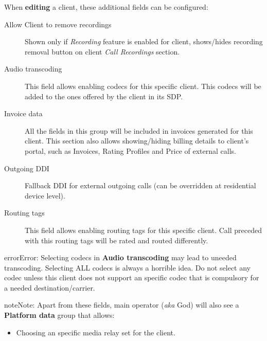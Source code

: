 \documentclass[letterpaper,10pt,english]{sphinxmanual}
\begin{document}
When \textbf{editing} a client, these additional fields can be configured:
\begin{description}
\item[{Allow Client to remove recordings}] \leavevmode{}\label{administration_portal/brand/clients/retail:term-allow-client-to-remove-recordings}
Shown only if \emph{Recording} feature is enabled for client, shows/hides recording
removal button on client \emph{Call Recordings} section.

\item[{Audio transcoding}] \leavevmode{}\label{administration_portal/brand/clients/retail:term-audio-transcoding}
This field allows enabling codecs for this specific client. This codecs will be added to
the ones offered by the client in its SDP.

\item[{Invoice data}] \leavevmode{}\label{administration_portal/brand/clients/retail:term-invoice-data}
All the fields in this group will be included in invoices generated for this client. This section also allows
showing/hiding billing details to client's portal, such as Invoices, Rating Profiles and Price of external calls.

\item[{Outgoing DDI}] \leavevmode{}\label{administration_portal/brand/clients/retail:term-outgoing-ddi}
Fallback DDI for external outgoing calls (can be overridden at residential device level).

\item[{Routing tags}] \leavevmode{}\label{administration_portal/brand/clients/retail:term-routing-tags}
This field allows enabling routing tags for this specific client. Call preceded with this
routing tags will be rated and routed differently.

\end{description}

\begin{notice}{error}{Error:}
Selecting codecs in \textbf{Audio transcoding} may lead to uneeded transcoding. Selecting ALL codecs is
always a horrible idea. Do not select any codec unless this client does not support an specific codec
that is compulsory for a needed destination/carrier.
\end{notice}

\begin{notice}{note}{Note:}
Apart from these fields, main operator (\emph{aka} God) will also see a \textbf{Platform data} group that allows:
\begin{itemize}
\item {} 
Choosing an specific media relay set for the client.

\end{itemize}
\end{notice}
\end{document}

